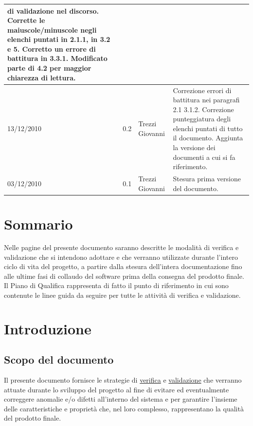 \begin{longtable}{|p{}|c|p{}|p{}|}
di validazione nel discorso. Corrette le maiuscole/minuscole negli elenchi
puntati in 2.1.1, in 3.2 e 5. Corretto un errore di battitura in 3.3.1.
Modificato parte di 4.2 per maggior chiarezza di lettura.\\
\hline
13/12/2010 & 0.2 & Trezzi Giovanni & Correzione errori di battitura nei
paragrafi 2.1 3.1.2. Correzione punteggiatura degli elenchi puntati di tutto il documento.
Aggiunta la versione dei documenti a cui si fa riferimento.\\
\hline
03/12/2010 & 0.1 & Trezzi Giovanni & Stesura prima versione del documento.\\
\end{longtable}


\tableofcontents


\chapter*{Sommario}
Nelle pagine del presente documento saranno descritte le modalit\`a di verifica
e validazione che si intendono adottare e che verranno utilizzate durante
l'intero ciclo di vita del progetto, a partire dalla stesura dell'intera
documentazione fino alle ultime fasi di collaudo del software prima della
consegna del prodotto finale. Il Piano di Qualifica rappresenta di fatto il
punto di riferimento in cui sono contenute le linee guida da seguire per tutte
le attivit\`a di verifica e validazione.


\thispagestyle{fancy} %

\chapter{Introduzione}
\thispagestyle{fancy} %

\section{Scopo del documento}

Il presente documento fornisce le strategie di \underline{verifica} e
\underline{validazione} che verranno attuate durante lo sviluppo del progetto al
fine di evitare ed eventualmente correggere anomalie e/o difetti all'interno del
sistema e per garantire l'insieme delle caratteristiche e propriet\`a che, nel
loro complesso, rappresentano la qualit\`a del prodotto finale.

